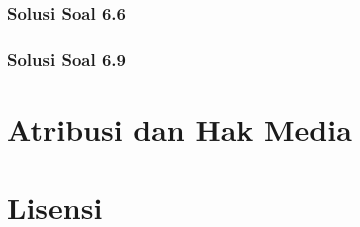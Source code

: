 \documentclass[11pt,a4paper,oneside]{book}
\begin{document}
\subsection*{Solusi Soal 6.6}

\subsection*{Solusi Soal 6.9}


\backmatter
\listoffigures
\chapter*{Atribusi dan Hak Media}






\chapter*{Lisensi}
\Lizenztext
\end{document}
